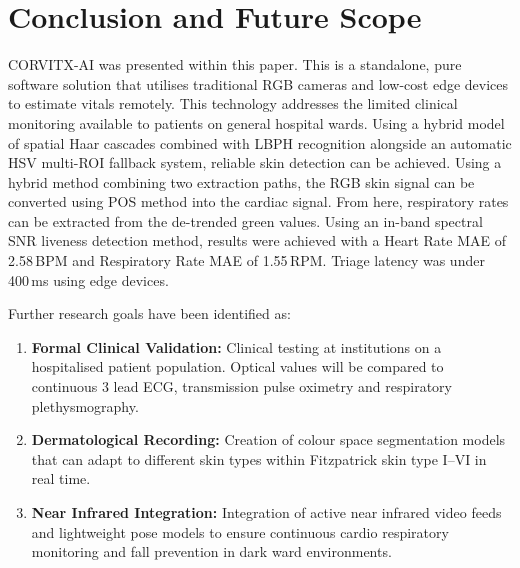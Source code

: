 \documentclass[conference]{IEEEtran}
\begin{document}
\section{Conclusion and Future Scope}
CORVITX-AI was presented within this paper. This is a standalone, pure software solution that utilises traditional RGB cameras and low-cost edge devices to estimate vitals remotely. This technology addresses the limited clinical monitoring available to patients on general hospital wards. Using a hybrid model of spatial Haar cascades combined with LBPH recognition alongside an automatic HSV multi-ROI fallback system, reliable skin detection can be achieved. Using a hybrid method combining two extraction paths, the RGB skin signal can be converted using POS method into the cardiac signal. From here, respiratory rates can be extracted from the de-trended green values. Using an in-band spectral SNR liveness detection method, results were achieved with a Heart Rate MAE of 2.58\,BPM and Respiratory Rate MAE of 1.55\,RPM. Triage latency was under 400\,ms using edge devices.

Further research goals have been identified as:
\begin{enumerate}
    \item \textbf{Formal Clinical Validation:} Clinical testing at institutions on a hospitalised patient population. Optical values will be compared to continuous 3 lead ECG, transmission pulse oximetry and respiratory plethysmography.
    \item \textbf{Dermatological Recording:} Creation of colour space segmentation models that can adapt to different skin types within Fitzpatrick skin type I--VI in real time.
    \item \textbf{Near Infrared Integration:} Integration of active near infrared video feeds and lightweight pose models to ensure continuous cardio respiratory monitoring and fall prevention in dark ward environments.
\end{enumerate}
\end{document}
